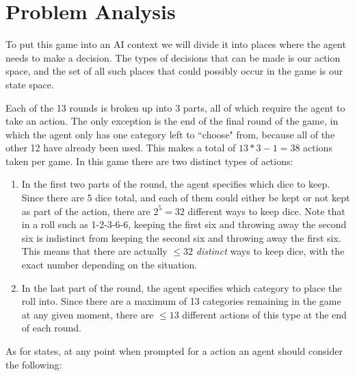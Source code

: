 \documentclass{article}
\begin{document}
\section{Problem Analysis}

To put this game into an AI context we will divide it into places where the
agent needs to make a decision. The types of decisions that can be made is our 
action space, and the set of all such places that could possibly occur in the
game is our state space.

\vspace{1em}

Each of the 13 rounds is broken up into 3 parts, all of which require the
agent to take an action. The only exception is the end of the final round of
the game, in which the agent only has one category left to ``choose" from,
because all of the other 12 have already been used. This makes a total of 
$13*3-1=38$ actions taken per game. In this game there are two distinct types of
actions: 

\begin{enumerate}
\item{}
In the 
first two parts of the round, the agent specifies which dice to keep. Since
there are 5 dice total, and each of them could either be kept or not kept as 
part of the action, there are $2^5=32$ different ways to keep dice. Note that in
a roll such as 1-2-3-6-6, keeping the first six and throwing away the second six
is indistinct from keeping the second six and throwing away the first six. This
means that there are actually $\le 32$ \emph{distinct} ways to keep dice, with
the exact number depending on the situation.

\item{}
In the last part of the round, the agent specifies which category to place the
roll into. Since there are a maximum of 13 categories remaining in the game at
any given moment, there are $\le 13$ different actions of this type at the end
of each round.

\end{enumerate}

As for states, at any point when prompted for a action an agent should
consider the following:
\end{document}
